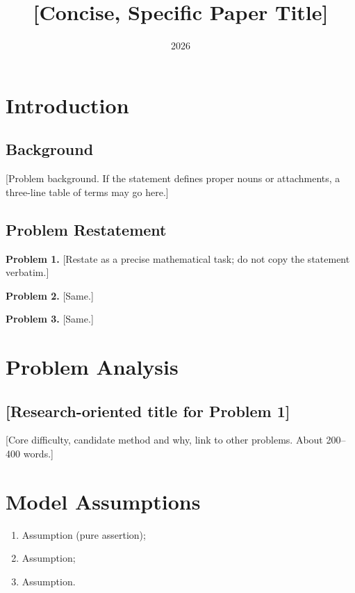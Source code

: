 \documentclass{swmcmthesis}
\title{[Concise, Specific Paper Title]}
\date{2026}                       %
\begin{document}
\maketitle
\tableofcontents
\newpage

\section{Introduction}

\subsection{Background}

[Problem background. If the statement defines proper nouns or attachments,
a three-line table of terms may go here.]

\subsection{Problem Restatement}

\textbf{Problem 1.} [Restate as a precise mathematical task; do not copy the
statement verbatim.]

\textbf{Problem 2.} [Same.]

\textbf{Problem 3.} [Same.]

\section{Problem Analysis}


\subsection{[Research-oriented title for Problem 1]}

[Core difficulty, candidate method and why, link to other problems.
About 200--400 words.]

\section{Model Assumptions}

\begin{enumerate}
    \item Assumption (pure assertion);
    \item Assumption;
    \item Assumption.
\end{enumerate}
\end{document}
